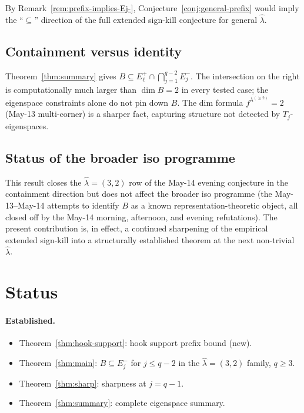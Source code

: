 \documentclass[11pt]{article}
\theoremstyle{definition}
\newcommand{\hatl}{\widehat\lambda}
\begin{document}
By Remark~\ref{rem:prefix-implies-Ej-},
Conjecture~\ref{conj:general-prefix} would imply the ``$\subseteq$''
direction of the full extended sign-kill conjecture for general
$\hatl$.

\subsection{Containment versus identity}

Theorem~\ref{thm:summary} gives $B \subseteq E_\ell^+ \cap
\bigcap_{j = 1}^{q - 2} E_j^-$.  The intersection on the right is
computationally much larger than $\dim B = 2$ in every tested case;
the eigenspace constraints alone do not pin down $B$.  The dim
formula $f^{\lambda^{(\ge 2)}} = 2$ (May-13 multi-corner) is a sharper
fact, capturing structure not detected by $T_j$-eigenspaces.

\subsection{Status of the broader iso programme}

This result closes the $\hatl = (3, 2)$ row of the May-14 evening
conjecture in the containment direction but does not affect the
broader iso programme (the May-13--May-14 attempts to identify $B$
as a known representation-theoretic object, all closed off by the
May-14 morning, afternoon, and evening refutations).  The present
contribution is, in effect, a continued sharpening of the empirical
extended sign-kill into a structurally established theorem at the
next non-trivial $\hatl$.

\section{Status}\label{sec:status}

\paragraph{Established.}
\begin{itemize}[topsep=0.3em,itemsep=0.1em]
\item Theorem~\ref{thm:hook-support}: hook support prefix bound
  (new).
\item Theorem~\ref{thm:main}: $B \subseteq E_j^-$ for $j \le q - 2$
  in the $\hatl = (3, 2)$ family, $q \ge 3$.
\item Theorem~\ref{thm:sharp}: sharpness at $j = q - 1$.
\item Theorem~\ref{thm:summary}: complete eigenspace summary.
\end{itemize}
\end{document}
